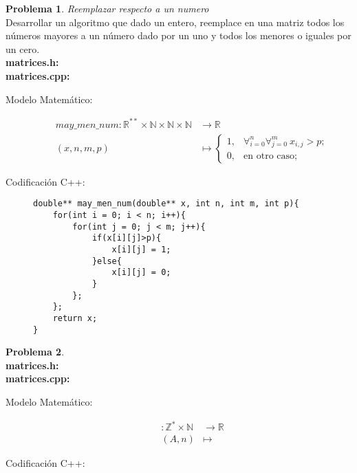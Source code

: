 \documentclass{article}
\theoremstyle{plain}
\theoremstyle{definition}
\newtheorem{problem}{Problema}
\begin{document}
\begin{problem} \emph{Reemplazar respecto a un numero}\\
Desarrollar un algoritmo que dado un entero, reemplace en una matriz todos los números mayores a un número dado por un uno y todos los menores o iguales por un cero.\\
\textbf{matrices.h:}\ \\
\textbf{matrices.cpp:}\ 
%
\begin{description}
\item[Modelo Matemático:]
%
\begin{align*}
may\_men\_num: \mathbb{R}^{**}\times\mathbb{N}\times\mathbb{N}\times\mathbb{N} &\to \mathbb{R}\\
(x,n,m,p) &\mapsto 
\begin{cases}
1,&\forall_{i=0}^{n}\forall_{j=0}^{m}\ x_{i,j} > p;\\
0,& \text{en otro caso;}
\end{cases}
\end{align*}
%
\item[Codificación \textsf{C++}:]\hfill
%
\begin{verbatim}
double** may_men_num(double** x, int n, int m, int p){
    for(int i = 0; i < n; i++){
        for(int j = 0; j < m; j++){
            if(x[i][j]>p){
                x[i][j] = 1;
            }else{
                x[i][j] = 0;
            }
        };
    };
    return x;
}
\end{verbatim}
\end{description}
\end{problem}

\begin{problem} \emph{}
\\
\textbf{matrices.h:}\ \\
\textbf{matrices.cpp:}\ 
%
\begin{description}
\item[Modelo Matemático:]
%
\begin{align*}
: \mathbb{Z}^*\times\mathbb{N} &\to \mathbb{R}\\
(A,n) &\mapsto 
\end{align*}
%
\item[Codificación \textsf{C++}:]\hfill
%
\begin{verbatim}

\end{verbatim}
\end{description}
\end{problem}
\end{document}
